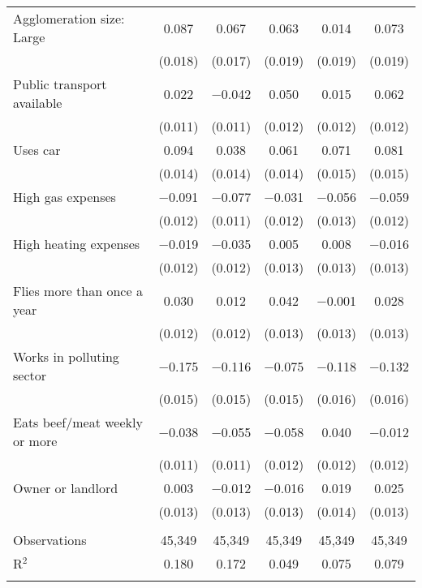 \begin{tabular}{@{\extracolsep{5pt}}lccccc}
  Agglomeration size: Large & 0.087 & 0.067 & 0.063 & 0.014 & 0.073 \\ 
  & (0.018) & (0.017) & (0.019) & (0.019) & (0.019) \\ 
  Public transport available & 0.022 & $-$0.042 & 0.050 & 0.015 & 0.062 \\ 
  & (0.011) & (0.011) & (0.012) & (0.012) & (0.012) \\ 
  Uses car & 0.094 & 0.038 & 0.061 & 0.071 & 0.081 \\ 
  & (0.014) & (0.014) & (0.014) & (0.015) & (0.015) \\ 
  High gas expenses & $-$0.091 & $-$0.077 & $-$0.031 & $-$0.056 & $-$0.059 \\ 
  & (0.012) & (0.011) & (0.012) & (0.013) & (0.012) \\ 
  High heating expenses & $-$0.019 & $-$0.035 & 0.005 & 0.008 & $-$0.016 \\ 
  & (0.012) & (0.012) & (0.013) & (0.013) & (0.013) \\ 
  Flies more than once a year & 0.030 & 0.012 & 0.042 & $-$0.001 & 0.028 \\ 
  & (0.012) & (0.012) & (0.013) & (0.013) & (0.013) \\ 
  Works in polluting sector & $-$0.175 & $-$0.116 & $-$0.075 & $-$0.118 & $-$0.132 \\ 
  & (0.015) & (0.015) & (0.015) & (0.016) & (0.016) \\ 
  Eats beef/meat weekly or more & $-$0.038 & $-$0.055 & $-$0.058 & 0.040 & $-$0.012 \\ 
  & (0.011) & (0.011) & (0.012) & (0.012) & (0.012) \\ 
  Owner or landlord & 0.003 & $-$0.012 & $-$0.016 & 0.019 & 0.025 \\ 
  & (0.013) & (0.013) & (0.013) & (0.014) & (0.013) \\ 
 \hline \\[-1.8ex] 

Observations & 45,349 & 45,349 & 45,349 & 45,349 & 45,349 \\ 
R$^{2}$ & 0.180 & 0.172 & 0.049 & 0.075 & 0.079 \\ 
\hline 
\hline \\[-1.8ex] 
\end{tabular} 